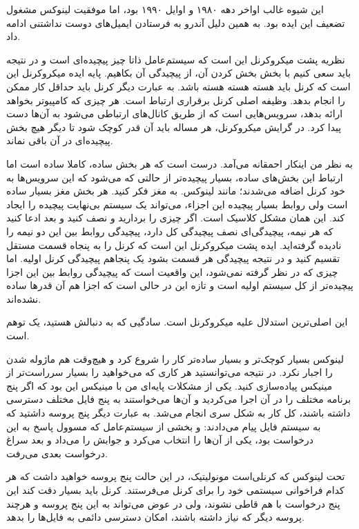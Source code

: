 این شیوه غالب اواخر دهه ۱۹۸۰ و اوایل ۱۹۹۰ بود، اما موفقیت لینوکس مشغول
تضعیف این ایده بود. به همین دلیل آندرو به فرستادن ایمیل‌های دوست
نداشتنی ادامه داد.

نظریه پشت میکروکرنل این است که سیستم‌عامل ذاتا چیز پیچیده‌ای است و در
نتیجه باید سعی کنیم با بخش بخش کردن آن، از پیچیدگی آن بکاهیم. پایه
ایده میکروکرنل این است که کرنل باید هسته هسته هسته باشد. به عبارت دیگر
کرنل باید حداقل کار ممکن را انجام بدهد. وظیفه اصلی کرنل برقراری ارتباط
است. هر چیزی که کامپیوتر بخواهد ارائه بدهد، سرویس‌هایی است که از طریق
کانال‌های ارتباطی می‌شود به آن‌ها دست پیدا کرد. در گرایش میکروکرنل، هر
مساله باید آن قدر کوچک شود تا دیگر هیچ بخش پیچیده‌ای در آن باقی نماند.

به نظر من اینکار احمقانه می‌آمد. درست است که هر بخش ساده،‌ کاملا ساده
است اما ارتباط این بخش‌های ساده، بسیار پیچیده‌تر از حالتی که می‌شود که
این سرویس‌ها به خود کرنل اضافه می‌شدند؛ مانند لینوکس. به مغز فکر
کنید. هر بخش مغز بسیار ساده است ولی روابط بسیار پیچیده این اجزاء،
می‌تواند یک سیستم بی‌نهایت پیچیده را ایجاد کند. این همان مشکل کلاسیک
 است. اگر چیزی را بردارید و نصف کنید و
بعد ادعا کنید که هر نیمه، پیچیدگی‌ای نصف پیچیدگی کل دارد،‌ پیچیدگی روابط
بین این دو نیمه را نادیده گرفته‌اید. ایده پشت میکروکرنل این است که کرنل
را به پنجاه قسمت مستقل تقسیم کنید و در نتیجه پیچیدگی هر قسمت بشود یک
پنجاهم پیچیدگی کرنل اولیه. اما چیزی که در نظر گرفته نمی‌شود، این واقعیت
است که پیچیدگی روابط بین این اجزا پیچیده‌تر از کل سیستم اولیه است و
تازه این در حالی است که اجزا هم آن قدرها ساده نشده‌اند.

این اصلی‌ترین استدلال علیه میکروکرنل است. سادگیی که به دنبالش هستید، یک
توهم است.

لینوکس بسیار کوچک‌تر و بسیار ساده‌تر کار را شروع کرد و هیچ‌وقت هم ماژوله
شدن را اجبار نکرد. در نتیجه می‌توانستید هر کاری که می‌خواهید را بسیار
سرراست‌تر از مینیکس پیاده‌سازی کنید. یکی از مشکلات پایه‌ای من با مینیکس
این بود که اگر پنج برنامه مختلف را در آن اجرا می‌کردید و آن‌ها می‌خواستند
به پنج فایل مختلف دسترسی داشته باشند، کل کار به شکل سری انجام می‌شد. به
عبارت دیگر پنج پروسه داشتید که به سیستم فایل پیام می‌دادند:
 و بخشی از سیستم‌عامل که
مسوول پاسخ به این درخواست بود، یکی از آن‌ها را انتخاب می‌کرد و جوابش را
می‌داد و بعد سراغ درخواست بعدی می‌رفت.

تحت لینوکس که کرنلی‌است مونولیتیک، در این حالت پنج پروسه خواهید داشت که
هر کدام فراخوانی سیستمی خود را برای کرنل می‌فرستند. کرنل باید بسیار دقت
کند این پنج درخواست با هم قاطی نشوند، ولی در عوض می‌تواند به این پنج
پروسه و هرچند پروسه دیگر که نیاز داشته باشند، امکان دسترسی دائمی به
فایل‌ها را بدهد.

